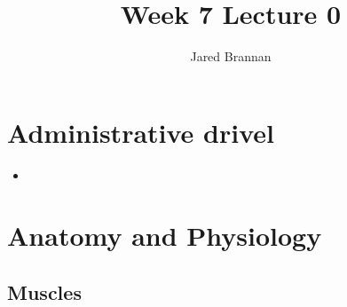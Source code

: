 \documentclass{article}
\title{Week 7 Lecture 0}
\author{Jared Brannan }
\theoremstyle{definition}
\begin{document}
\maketitle

\section{Administrative drivel}
\begin{itemize}
	\item
\end{itemize}

\section{Anatomy and Physiology}

\subsection{Muscles}
\end{document}
